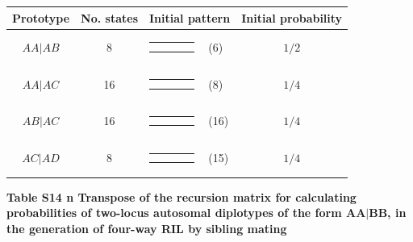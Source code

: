 \documentclass[9pt,letterpaper,twoside]{article}
\begin{document}
\bigskip

{
\begin{center}
\begin{tabular}{ccrlc} \hline
Prototype & No. states & \multicolumn{2}{c}{Initial pattern} & Initial probability \\ \hline
$AA|AB$ & 8 & 
{\renewcommand{\arraystretch}{0.3}
\renewcommand{\tabcolsep}{0.5mm}
\parbox[b][3mm][c]{12mm}{
\begin{tabular}{|p{2mm}|p{2mm}||p{2mm}|p{2mm}|} \hline
$\bullet$ &           &           &           \\
$\bullet$ & $\circ  $ &           &           \\ \hline
\end{tabular}}}
& (6) & $1/2$ \\
$AA|AC$ & 16 & 
{\renewcommand{\arraystretch}{0.3}
\renewcommand{\tabcolsep}{0.5mm}
\parbox[b][3mm][c]{12mm}{
\begin{tabular}{|p{2mm}|p{2mm}||p{2mm}|p{2mm}|} \hline
$\bullet$ &           &           &           \\
$\bullet$ &           & $\circ  $ &           \\ \hline
\end{tabular}}}
& (8) & $1/4$ \\
$AB|AC$ & 16 & 
{\renewcommand{\arraystretch}{0.3}
\renewcommand{\tabcolsep}{0.5mm}
\parbox[b][3mm][c]{12mm}{
\begin{tabular}{|p{2mm}|p{2mm}||p{2mm}|p{2mm}|} \hline
$\bullet$ &           &           &           \\
          & $\bullet$ & $\circ  $ &           \\ \hline
\end{tabular}}}
& (16) & $1/4$ \\
$AC|AD$ & 8 & 
{\renewcommand{\arraystretch}{0.3}
\renewcommand{\tabcolsep}{0.5mm}
\parbox[b][3mm][c]{12mm}{
\begin{tabular}{|p{2mm}|p{2mm}||p{2mm}|p{2mm}|} \hline
$\bullet$ &           &           &           \\
          &           & $\bullet$ & $\circ  $ \\ \hline
\end{tabular}}}
& (15) & $1/4$ \\
\hline
\end{tabular}
\end{center}
}

\newpage

\noindent \textbf{Table S14 {\color{white} n} Transpose of the recursion matrix for
calculating probabilities of two-locus autosomal diplotypes of the form $\boldsymbol{AA|BB}$,
in the generation of four-way RIL by sibling mating}
\end{document}
